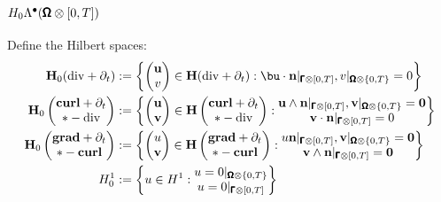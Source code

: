         \subsection*{$H_{0}\Lambda^{\bullet}(\pmb{\mathsf{\Omega}}\otimes[0, T])$}
            Define the Hilbert spaces:
            \begin{align}
                \bfH_{0}(\rmdiv + \partial_{t})  &:=  \left\{\begin{pmatrix} \bfu \\ v \end{pmatrix} \in \bfH(\rmdiv + \partial_{t}) : \bu\cdot\bfn|_{\bfGamma\otimes[0, T]}, v|_{\bfOmega\otimes\{0, T\}} = 0\right\}  \\
                \bfH_{0}\left(\begin{matrix} \bfcurl + \partial_{t} \\ * - \rmdiv \end{matrix}\right)  &:=  \left\{\begin{pmatrix} \bfu \\ \bfv \end{pmatrix} \in \bfH\left(\begin{matrix} \bfcurl + \partial_{t} \\ * - \rmdiv \end{matrix}\right) : \begin{matrix} \bfu\wedge\bfn|_{\bfGamma\otimes[0, T]}, \bfv|_{\bfOmega\otimes\{0, T\}} = \bfzero \\ \bfv\cdot\bfn|_{\bfGamma\otimes[0, T]} = 0 \end{matrix}\right\}  \\
                \bfH_{0}\left(\begin{matrix} \bfgrad + \partial_{t} \\ * - \bfcurl \end{matrix}\right)  &:=  \left\{\begin{pmatrix} u \\ \bfv \end{pmatrix} \in \bfH\left(\begin{matrix} \bfgrad + \partial_{t} \\ * - \bfcurl \end{matrix}\right) : \begin{matrix} u\bfn|_{\bfGamma\otimes[0, T]}, \bfv|_{\bfOmega\otimes\{0, T\}} = \bfzero \\ \bfv\wedge\bfn|_{\bfGamma\otimes[0, T]} = \bfzero \end{matrix}\right\}  \\
                H^{1}_{0}  &:=  \left\{u \in H^{1} : \begin{matrix} u = 0|_{\bfOmega\otimes\{0, T\}} \\ u = 0|_{\bfGamma\otimes[0, T]} \end{matrix}\right\}
            \end{align}
